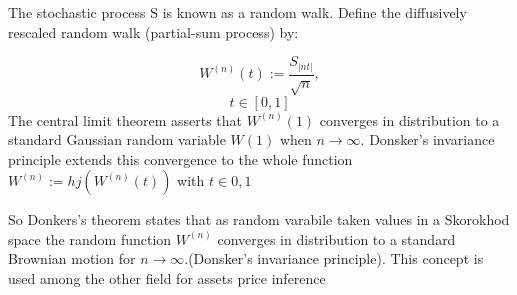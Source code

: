 \documentclass{article}
\begin{document}
The stochastic process S is known as a random walk. Define the diffusively rescaled random walk (partial-sum process) by:

\[ W^{(n)} (t) := \frac{S_{|nt|}}{\sqrt{n}}, \]   \[t\in [0,1]\]
The central limit theorem asserts that $W^{(n)}(1)$ converges in distribution to a standard Gaussian random variable $W(1)$ when $n \rightarrow \infty $.
Donsker’s invariance principle extends this convergence to the whole function $W^{(n)}:=hj(W^{(n)}(t)) $ with $t \in 0,1$

So Donkers’s theorem states that as random varabile taken values in a Skorokhod space the random function $W^{(n)}$ converges in distribution to a standard Brownian motion for $n \rightarrow \infty $.(Donsker’s invariance principle).
This concept is used among the other field for assets price inference 



\end{document}
